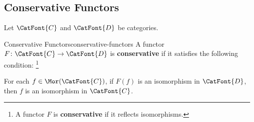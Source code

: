 \subsection{Conservative Functors}\label{subsection-conservative-functors}
Let $\CatFont{C}$ and $\CatFont{D}$ be categories.
\begin{definition}{Conservative Functors}{conservative-functors}%
    A functor $F\colon\CatFont{C}\to\CatFont{D}$ is \textbf{conservative} if it satisfies the following condition:%
    \footnote{%
        A functor $F$ is \textbf{conservative} if it reflects isomorphisms.
        \par\vspace*{\TCBBoxCorrection}
    }%
    \begin{itemize}
        \itemstar For each $f\in\Mor(\CatFont{C})$, if $F(f)$ is an isomorphism in $\CatFont{D}$, then $f$ is an isomorphism in $\CatFont{C}$.%
    \end{itemize}
\end{definition}

